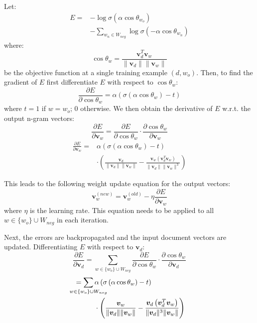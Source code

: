\documentclass[11pt,a4paper]{article}
\begin{document}
Let: 
\begin{align}
E =  &- \log \sigma \left( \alpha \cos \theta_{w_o} \right) \nonumber \\
&- \sum_{w_n \in W_{neg}} \log \sigma \left( - \alpha \cos \theta_{w_n} \right)  
\end{align}
where:
\begin{equation}
\cos \theta_w = \frac {\mathbold{v}_d^T \mathbold{v}_w} {\lVert \mathbold{v}_d \rVert \lVert \mathbold{v}_w \rVert}
\end{equation}
be the objective function at a single training example $(d,w_o)$. Then, to find the gradient of $E$ first differentiate $E$ with respect to $\cos \theta_w$: 
\begin{equation}
\frac {\partial E} {\partial \cos \theta_w} = \alpha \left( \sigma \left( \alpha \cos \theta_w \right) - t \right)
\end{equation}
where $t = 1$ if $w = w_o$; $0$ otherwise. We then obtain the derivative of $E$ w.r.t. the output n-gram vectors: 
\begin{equation}
\frac {\partial E} {\partial \mathbold{v}_w} = \frac {\partial E} {\partial \cos \theta_w} \cdot \frac {\partial \cos \theta_w} {\partial \mathbold{v}_w} 
\end{equation}
\begin{align}
\frac {\partial E} {\partial \mathbold{v}_w} = {}&\alpha \left( \sigma \left( \alpha \cos \theta_w \right) - t \right) \nonumber \\
&\cdot\left( \frac {\mathbold{v}_d} {\lVert \mathbold{v}_d \rVert \lVert \mathbold{v}_w \rVert} - \frac { \mathbold{v}_w\left(\mathbold{v}_d^T \mathbold{v}_w\right)} {\lVert \mathbold{v}_d \rVert \lVert \mathbold{v}_w \rVert^3} \right)
\end{align}

This leads to the following weight update equation for the output vectors: 
\begin{equation}
\mathbold{v}_w^{(new)} = \mathbold{v}_w^{(old)} - \eta \frac {\partial E} {\partial \mathbold{v}_w}
\end{equation}
where $\eta$ is the learning rate. This equation needs to be applied to all $w \in \{w_o\} \cup W_{neg}$ in each iteration.

Next, the errors are backpropagated and the input document vectors are updated. Differentiating $E$ with respect to $\mathbold{v}_d$: 
\begin{equation}
\frac {\partial E} {\partial \mathbold{v}_d} = \sum_{w \in \{w_o\} \cup W_{neg}}  \frac {\partial E} {\partial \cos \theta_w} \cdot \frac {\partial \cos \theta_w} {\partial \mathbold{v}_d}
\end{equation}
\begin{align}
{}= \sum_{\mathclap{w \in \{w_o\} \cup W_{neg}}}{} &\alpha \left( \sigma \left( \alpha \cos \theta_w \right) - t \right) \nonumber \\
&\cdot\left( \frac {\mathbold{v}_w} {\lVert \mathbold{v}_d \rVert \lVert \mathbold{v}_w \rVert} - \frac { \mathbold{v}_d\left(\mathbold{v}_d^T \mathbold{v}_w\right)} {\lVert \mathbold{v}_d \rVert^3 \lVert \mathbold{v}_w \rVert} \right)
\end{align}
\end{document}
